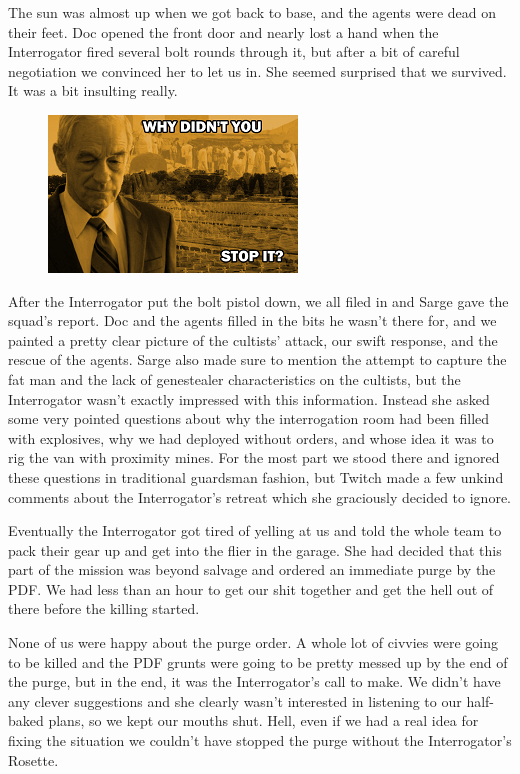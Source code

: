 The sun was almost up when we got back to base, and the agents were dead on their feet. 
Doc opened the front door and nearly lost a hand when the Interrogator fired several bolt rounds through it, but after a bit of careful negotiation we convinced her to let us in. 
She seemed surprised that we survived. It was a bit insulting really.

\begin{figure}
	\begin{center}
		\includegraphics[width=\figwidth]{pics/5/17.png}
	\end{center}
\end{figure}
After the Interrogator put the bolt pistol down, we all filed in and Sarge gave the squad’s report. 
Doc and the agents filled in the bits he wasn’t there for, and we painted a pretty clear picture of the cultists’ attack, our swift response, and the rescue of the agents. 
Sarge also made sure to mention the attempt to capture the fat man and the lack of genestealer characteristics on the cultists, but the Interrogator wasn’t exactly impressed with this information. 
Instead she asked some very pointed questions about why the interrogation room had been filled with explosives, why we had deployed without orders, and whose idea it was to rig the van with proximity mines. 
For the most part we stood there and ignored these questions in traditional guardsman fashion, but Twitch made a few unkind comments about the Interrogator’s retreat which she graciously decided to ignore.

Eventually the Interrogator got tired of yelling at us and told the whole team to pack their gear up and get into the flier in the garage. 
She had decided that this part of the mission was beyond salvage and ordered an immediate purge by the PDF. 
We had less than an hour to get our shit together and get the hell out of there before the killing started. 

None of us were happy about the purge order. 
A whole lot of civvies were going to be killed and the PDF grunts were going to be pretty messed up by the end of the purge, but in the end, it was the Interrogator’s call to make. 
We didn’t have any clever suggestions and she clearly wasn’t interested in listening to our half-baked plans, so we kept our mouths shut. 
Hell, even if we had a real idea for fixing the situation we couldn’t have stopped the purge without the Interrogator’s Rosette.

